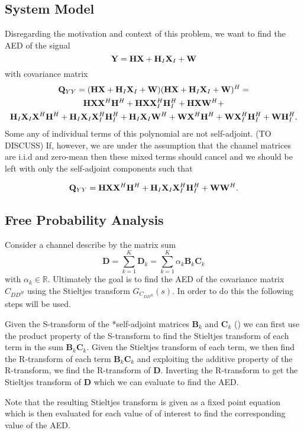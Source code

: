 \documentclass[12pt,a4paper]{report}
\begin{document}
\subsection{System Model}
Disregarding the motivation and context of this problem, we want to find the AED of the signal 
\begin{equation}
\mathbf{Y} = \mathbf{H}\mathbf{X} + \mathbf{H}_I \mathbf{X}_I + \mathbf{W}
\end{equation}
with covariance matrix 
\begin{gather*}
\mathbf{Q}_{YY} = (\mathbf{H}\mathbf{X} + \mathbf{H}_I \mathbf{X}_I + \mathbf{W})(\mathbf{H}\mathbf{X} + \mathbf{H}_I \mathbf{X}_I + \mathbf{W})^H = 
\\
\mathbf{H}\mathbf{X}\mathbf{X}^H\mathbf{H}^H + \mathbf{H}\mathbf{X}\mathbf{X}_I^H\mathbf{H}_I^H + \mathbf{H}\mathbf{X}\mathbf{W}^H +\\ \mathbf{H}_I \mathbf{X}_I \mathbf{X}^H\mathbf{H}^H + \mathbf{H}_I \mathbf{X}_I\mathbf{X}_I^H\mathbf{H}_I^H + \mathbf{H}_I \mathbf{X}_I\mathbf{W}^H + \mathbf{W}\mathbf{X}^H\mathbf{H}^H + \mathbf{W}\mathbf{X}_I^H\mathbf{H}_I^H + \mathbf{W}\mathbf{H}_I^H.
\end{gather*}
Some any of individual terms of this polynomial are not self-adjoint. (TO DISCUSS) If, however, we are under the assumption that the channel matrices are i.i.d and zero-mean then these mixed terms should cancel and we should be left with only the self-adjoint components such that

\begin{gather*}
\mathbf{Q}_{YY} =
\mathbf{H}\mathbf{X}\mathbf{X}^H\mathbf{H}^H + \mathbf{H}_I \mathbf{X}_I\mathbf{X}_I^H\mathbf{H}_I^H + \mathbf{W}\mathbf{W}^H.
\end{gather*}
\subsection{Free Probability Analysis}\label{decont_fpt}
Consider a channel describe by the matrix sum
\begin{equation}
\mathbf{D} = \sum_{k=1}^{K}\mathbf{D}_k = \sum_{k=1}^{K} \alpha_k \mathbf{B}_k \mathbf{C}_k
\end{equation}
with $\alpha_k \in \mathbb{R}$. Ultimately the goal is to find the AED of the covariance matrix $C_{DD^H}$ using the Stieltjes transform  $G_{C_{DD^H}}(s)$. In order to do this the following steps will be used.


Given the S-transform of the *self-adjoint matrices $\mathbf{B}_k $ and $\mathbf{C}_k$ (\cite{nica2006lectures}) we can first use the product property of the S-transform to find the Stieltjes transform of each term in the sum $\mathbf{B}_k \mathbf{C}_k$. Given the Stieltjes transform of each term, we then find the R-transform of each term $\mathbf{B}_k \mathbf{C}_k$ and exploiting the additive property of the R-transform, we find the R-transform of $\mathbf{D}$. Inverting the R-transform to get the Stieltjes transform of $\mathbf{D}$ which we can evaluate to find the AED.
\par
Note that the resulting Stieltjes transform is given as a fixed point equation which is then evaluated for each value of of interest to find the corresponding value of the AED. 
\end{document}
